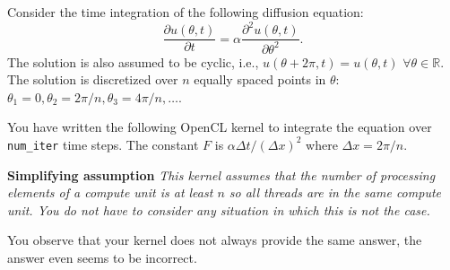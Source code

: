 \question{}

Consider the time integration of the following diffusion equation:
\[ \frac{\partial u(\theta, t)}{\partial t} = \alpha \frac{\partial^2 u(\theta, t)}{\partial \theta^2}. \]
The solution is also assumed to be cyclic, i.e., $u(\theta + 2\pi, t) = u(\theta, t)$ $\forall \theta \in \mathbb{R}$.
The solution is discretized over $n$ equally spaced points in $\theta$:
$\theta_1 = 0, \theta_2 = 2\pi/n, \theta_3 = 4\pi/n, \ldots$.

You have written the following OpenCL kernel to integrate
the equation over \lstinline|num_iter| time steps.
The constant $F$ is $\alpha \Delta t / (\Delta x)^2$ where $\Delta x = 2\pi/n$.

\textbf{Simplifying assumption} \emph{This kernel assumes that the number of processing elements of a compute unit is at least $n$
so all threads are in the same compute unit.
You do not have to consider any situation in which this is not the case.}



You observe that your kernel does not always provide the same answer,
the answer even seems to be incorrect.

